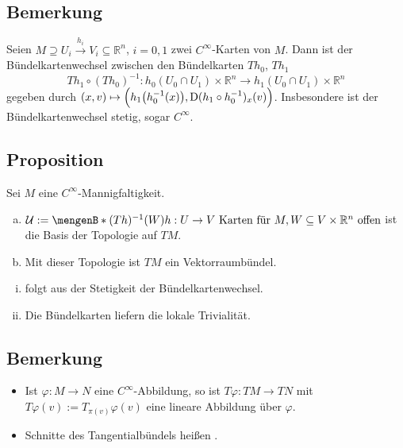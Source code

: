 \subsection[Bemerkung: Bündelkartenwechsel]{Bemerkung} %
\label{sub:197}
Seien $M \supseteq U_i \xrightarrow{\, h_i \,} V_i \subseteq \mathds{R}^n $, $i=0,1$ zwei $C^\infty$-Karten von $M$. Dann ist der Bündelkartenwechsel zwischen den 
Bündelkarten $T h_0$, $T h_1$
\[
	T h_1 \circ (T h_0) ^{-1} : h_0(U_0 \cap U_1) \times \mathds{R}^n \longrightarrow h_1(U_0 \cap U_1) \times \mathds{R}^n
\]
gegeben durch $(x,v) \mapsto \enbrace[\Big]{h_1 \enbrace*{h_0^{-1}(x)}, \D ( h_1 \circ h_0 ^{-1})_x (v)}$. Insbesondere ist der Bündelkartenwechsel stetig, sogar $C^\infty$.

\subsection{Proposition} %
\label{sub:198}
Sei $M$ eine $C^\infty$-Mannigfaltigkeit.
\begin{enumerate}[a)]
	\item $\mathcal{U} := \set[(T h) ^{-1} (W)]{h : U \to V \text{ Karten für }M , W \subseteq V \times \mathds{R}^n \text{ offen}} $ ist die Basis der Topologie auf $T M$.
	\item Mit dieser Topologie ist $T M$ ein Vektorraumbündel.
\end{enumerate}
\begin{enumerate}[(i)]
	\item folgt aus der Stetigkeit der Bündelkartenwechsel.
	\item Die Bündelkarten liefern die lokale Trivialität. \bewende
\end{enumerate}

\subsection{Bemerkung} %
\label{sub:199}
\begin{itemize}
	\item Ist $\varphi : M \to N$ eine $C^\infty$-Abbildung, so ist $T \varphi : T M  \to T N$ mit $T \varphi(v) := T_{\pi(v)} \varphi(v)$ eine lineare Abbildung über 
	$\varphi$.
	\item Schnitte des Tangentialbündels heißen . 
\end{itemize}
\newpage

